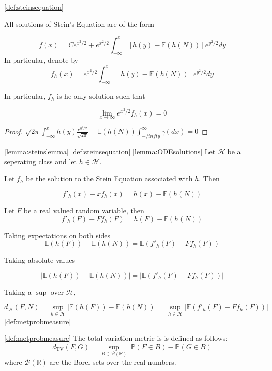 \begin{lemma}[Proposition]
  \label{lemma:ODEsolutions}
  \ref{def:steinsequation}

  All solutions of Stein's Equation are of the form 

  \[
    f(x) = Ce^{x^2/2} + e^{x^2/2}\int_{-\infty}^x [h(y)-\mathbb{E}(h(N))]e^{y^2/2} dy 
  \]
  In particular, denote by 
  \[
    f_h(x) = e^{x^2/2}\int_{-\infty}^x [h(y)-\mathbb{E}(h(N))]e^{y^2/2} dy
  \]

  In particular, $f_h$ is he only solution such that 

  \[
    \lim_{x \to \infty} e^{x^2/2} f_h(x) = 0
  \]
\end{lemma}

\begin{proof}
 $ \sqrt{2\pi}\int_{-\infty}^x h(y) \frac{e^{y^2/2}}{\sqrt{2\pi}} - \mathbb{E}(h(N))\int_{-/infty}^\infty \gamma(dx) = 0$
\end{proof}

\begin{theorem}
  \label{thm:steinsmetrics}
  \ref{lemma:steinslemma}
  \ref{def:steinsequation}
  \ref{lemma:ODEsolutions}
  Let $\mathcal{H}$ be a seperating class and let $h \in \mathcal{H}$. 

  Let $f_h$ be the solution to the Stein Equation associated with $h$. Then 

  \[
    f'_h(x)-xf_h(x) = h(x)-\mathbb{E}(h(N))
  \]

  Let $F$ be a real valued random variable, then 
  \[
    f'_h(F)-Ff_h(F) = h(F)-\mathbb{E}(h(N))
  \]

  Taking expectations on both sides 
  \[
    \mathbb{E}(h(F))-\mathbb{E}(h(N)) = \mathbb{E}(f'_h(F)-Ff_h(F))
  \]

  Taking absolute values 

  \[
   | \mathbb{E}(h(F))-\mathbb{E}(h(N))| = |\mathbb{E}(f'_h(F)-Ff_h(F))|
  \]

  Taking a $\sup$ over $\mathcal{H}$, 

  \[
    d_{\mathcal{H}}(F,N)= \sup_{h \in \mathcal{H}}  | \mathbb{E}(h(F))-\mathbb{E}(h(N))| = \sup_{h \in \mathcal{H}} |\mathbb{E}(f'_h(F)-Ff_h(F))| 
  \]
  \ref{def:metprobmeasure}
\end{theorem}

\begin{definition}[TV Metric]
  \label{def:tvmetric}
  \ref{def:metprobmeasure}
The total variation metric is is defined as follows: 
\[
  d_\operatorname{TV}(F,G) = \sup_{B \in \mathcal{B}(\mathbb{R})} | \mathbb{P}(F \in B) - \mathbb{P}(G \in B)
\]
where $\mathcal{B}(\mathbb{R})$ are the Borel sets over the real numbers. 
\end{definition}

